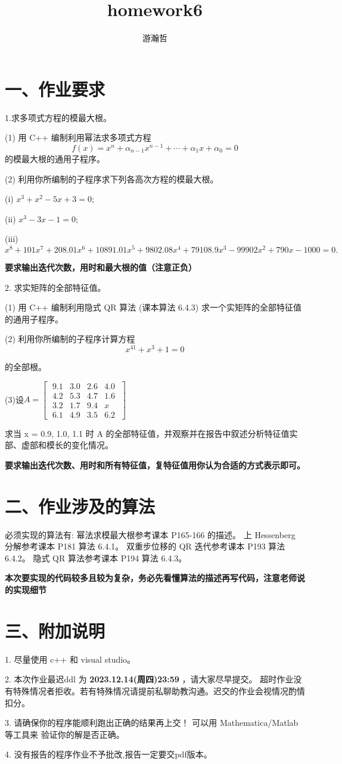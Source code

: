 \documentclass{article}
\title{homework6}
\author{游瀚哲}
\begin{document}
\maketitle

\section*{一、作业要求}

1.求多项式方程的模最大根。

(1) 用 C++ 编制利用幂法求多项式方程 
$$f(x) = x^n + \alpha_{n-1}x^{n-1} +\cdots+ \alpha_1 x + \alpha_0 = 0 $$
的模最大根的通用子程序。

(2) 利用你所编制的子程序求下列各高次方程的模最大根。

(i) $x^3 + x^2 - 5x + 3 = 0;$

(ii) $x^3 - 3x - 1 = 0;$

(iii) $x^8 + 101x^7 + 208.01x^6 + 10891.01x^5 + 9802.08x^4 + 79108.9x^3-99902x^2 + 790x-1000 = 0.$

\textbf{要求输出迭代次数，用时和最大根的值（注意正负）}


2. 求实矩阵的全部特征值。

(1) 用 C++ 编制利用隐式 QR 算法 (课本算法 6.4.3) 求一个实矩阵的全部特征值的通用子程序。

(2) 利用你所编制的子程序计算方程 
$$x^{41} + x^3 + 1 = 0 $$

的全部根。

(3)设$A=\begin{bmatrix}
    \;9.1 & 3.0 & 2.6 & 4.0 \;\\
    \;4.2 & 5.3 & 4.7 & 1.6 \;\\
    \;3.2 & 1.7 & 9.4 & x \;\\
    \;6.1 & 4.9 & 3.5 & 6.2\; 
    \end{bmatrix}
        $

求当 x = 0.9, 1.0, 1.1 时 A 的全部特征值，并观察并在报告中叙述分析特征值实部、虚部和模长的变化情况。

\textbf{要求输出迭代次数、用时和所有特征值，复特征值用你认为合适的方式表示即可。}

\section*{二、作业涉及的算法}

必须实现的算法有:
幂法求模最大根参考课本 P165-166 的描述。
上 Hessenberg 分解参考课本 P181 算法 6.4.1。
双重步位移的 QR 迭代参考课本 P193 算法 6.4.2。
隐式 QR 算法参考课本 P194 算法 6.4.3。

\textbf{本次要实现的代码较多且较为复杂，务必先看懂算法的描述再写代码，注意老师说的实现细节}


\section*{三、附加说明}
1. 尽量使用 c++ 和 visual studio。

2. 本次作业最迟ddl 为 \textbf{2023.12.14(周四)23:59} ，请大家尽早提交。
超时作业没有特殊情况者拒收。若有特殊情况请提前私聊助教沟通。迟交的作业会视情况酌情扣分。

3. 请确保你的程序能顺利跑出正确的结果再上交！
可以用 Mathematica/Matlab 等工具来 验证你的解是否正确。

4. 没有报告的程序作业不予批改,报告一定要交pdf版本。
\end{document}
